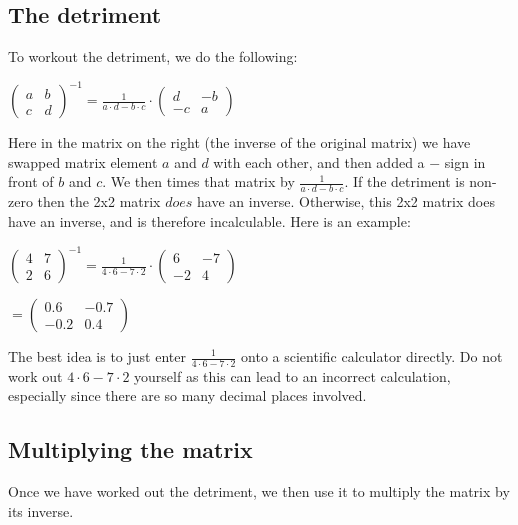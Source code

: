 \documentclass[options]{article}
\begin{document}
\subsection{The detriment}
To workout the detriment, we do the following:
\begin{center}
    \(
        \begin{pmatrix}
            a & b\\
            c & d
        \end{pmatrix}
        ^{-1} 
        =
        \frac{1}{a \cdot d - b \cdot c}
        \cdot
        \begin{pmatrix}
            d & -b\\
            -c & a
        \end{pmatrix}
    \)
\end{center}
Here in the matrix on the right (the inverse of the original matrix) we have swapped matrix element \(a\) and \(d\) with each other, and then added a \(-\) sign in front of \(b\) and \(c\). 
We then times that matrix by \( \frac{1}{{a \cdot d - b \cdot c}} \). If the detriment is non-zero then the 2x2 matrix \(\textit{does}\) have an inverse. Otherwise, this 2x2 matrix does have an inverse,
and is therefore incalculable. Here is an example:
\begin{center}
    \(
        \begin{pmatrix}
            4 & 7\\
            2 & 6
        \end{pmatrix}
        ^{-1} 
        =
        \frac{1}{4 \cdot 6 - 7 \cdot 2}
        \cdot
        \begin{pmatrix}
            6 & -7\\
            -2 & 4
        \end{pmatrix}
    \)

    \(
        =
        \begin{pmatrix}
            0.6 & -0.7\\
            -0.2 & 0.4
        \end{pmatrix}
    \)
\end{center}
The best idea is to just enter \(\frac{1}{4 \cdot 6 - 7 \cdot 2}\) onto a scientific calculator directly. Do not work out
\( 4 \cdot 6 - 7 \cdot 2 \) yourself as this can lead to an incorrect calculation, especially since there are so many decimal places involved. 
\subsection{Multiplying the matrix}
Once we have worked out the detriment, we then use it to multiply the matrix by its inverse. 
\end{document}
